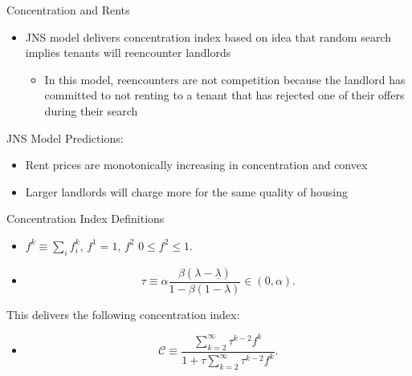 \documentclass[10pt, xcolor=dvipsnames]{beamer}
\begin{document}
\begin{frame}{Concentration and Rents}
    \begin{itemize}
        \item JNS model delivers concentration index based on idea that random search implies tenants will reencounter landlords
        \begin{itemize}
            \item In this model, reencounters are not competition because the landlord has committed to not renting to a tenant that has rejected one of their offers during their search 
        \end{itemize}
    \end{itemize}
    JNS Model Predictions:
    \begin{itemize}
        \item Rent prices are monotonically increasing in concentration and convex
        \item Larger landlords will charge more for the same quality of housing
    \end{itemize}
\end{frame}

\begin{frame}{Concentration Index}
Definitions
    \begin{itemize}
    \item $f^k \equiv \sum_i f_i^k$, $f^1 = 1$, $f^2$  $0 \leq f^2 \leq 1$.
\item  \begin{equation}
            \tau \equiv \alpha \frac{\beta(\lambda - \underline{\lambda})}{1 - \beta(1 - \lambda)} \in (0, \alpha).
        \end{equation}
\end{itemize}
This delivers the following concentration index:
\begin{itemize}
        \item
            \begin{equation}
                \mathcal{C} \equiv \frac{\sum_{k=2}^{\infty} \tau^{k-2} f^k}{1 + \tau \sum_{k=2}^{\infty} \tau^{k-2} f^k}.
            \end{equation}
\end{itemize}

\end{frame}
\end{document}
